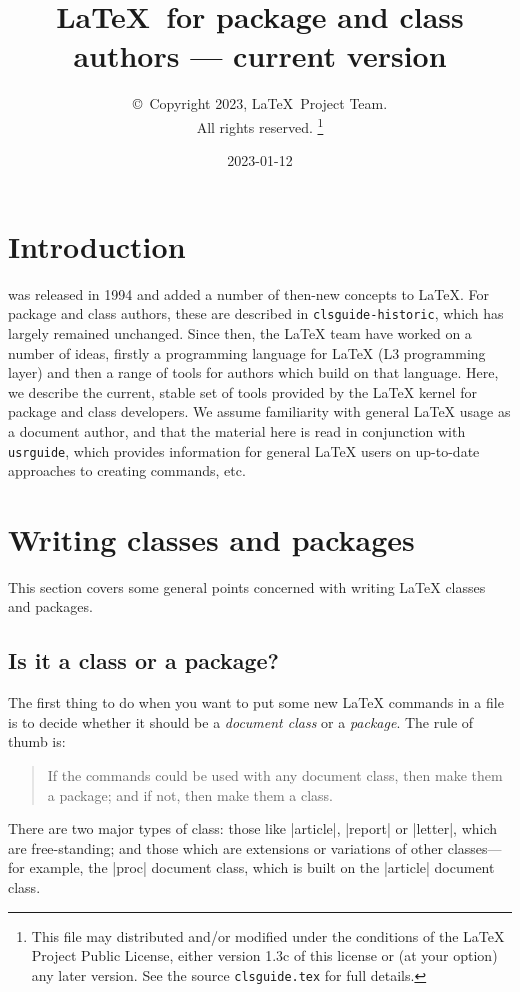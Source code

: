 \documentclass{ltxguide}
\title{\LaTeX\ for package and class authors --- current version}
\author{\copyright~Copyright 2023, \LaTeX\ Project Team.\\
   All rights reserved.%
   \footnote{This file may distributed and/or modified under the
     conditions of the \LaTeX{} Project Public License, either version 1.3c
     of this license or (at your option) any later version. See the source
    \texttt{clsguide.tex} for full details.}%
}
\date{2023-01-12}
\begin{document}
\maketitle

\tableofcontents

\section{Introduction}

\LaTeXe{} was released in 1994 and added a number of then-new concepts to
\LaTeX{}. For package and class authors, these are described in
\texttt{clsguide-historic}, which has largely remained unchanged. Since then,
the \LaTeX{} team have worked on a number of ideas, firstly a programming
language for \LaTeX{} (L3 programming layer) and then a range of tools for
authors which build on that language. Here, we describe the current, stable set
of tools provided by the \LaTeX{} kernel for package and class developers. We
assume familiarity with general \LaTeX{} usage as a document author, and that
the material here is read in conjunction with \texttt{usrguide}, which provides
information for general \LaTeX{} users on up-to-date approaches to creating
commands, etc.

\section{Writing classes and packages}
\label{Sec:writing}

This section covers some general points concerned with writing
\LaTeX{} classes and packages.

\subsection{Is it a class or a package?}
\label{Sec:classorpkg}

The first thing to do when you want to put some new \LaTeX{} commands
in a file is to decide whether it should be a \emph{document class} or a
\emph{package}.  The rule of thumb is:
\begin{quote}
  If the commands could be used with any document class, then make
  them a package; and if not, then make them a class.
\end{quote}

There are two major types of class: those like |article|, |report| or
|letter|, which are free-standing; and those which are extensions or
variations of other classes---for example, the |proc| document class,
which is built on the |article| document class.
\end{document}
